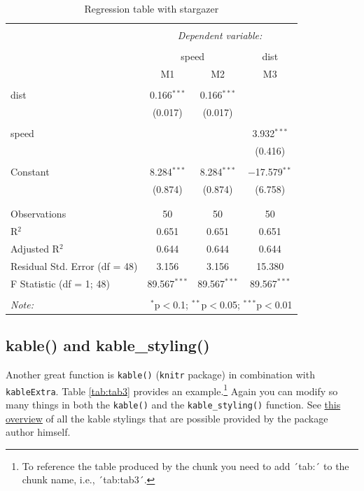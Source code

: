 \documentclass[
  12pt,
]{article}
\begin{document}
\begin{table}[H] \centering 
  \caption{Regression table with stargazer} 
  \label{tab2} 
\begin{tabular}{@{\extracolsep{5pt}}lccc} 
\\[-1.8ex]\hline 
\hline \\[-1.8ex] 
 & \multicolumn{3}{c}{\textit{Dependent variable:}} \\ 
\cline{2-4} 
\\[-1.8ex] & \multicolumn{2}{c}{speed} & dist \\ 
 & M1 & M2 & M3 \\ 
\hline \\[-1.8ex] 
 dist & 0.166$^{***}$ & 0.166$^{***}$ &  \\ 
  & (0.017) & (0.017) &  \\ 
  & & & \\ 
 speed &  &  & 3.932$^{***}$ \\ 
  &  &  & (0.416) \\ 
  & & & \\ 
 Constant & 8.284$^{***}$ & 8.284$^{***}$ & $-$17.579$^{**}$ \\ 
  & (0.874) & (0.874) & (6.758) \\ 
  & & & \\ 
\hline \\[-1.8ex] 
Observations & 50 & 50 & 50 \\ 
R$^{2}$ & 0.651 & 0.651 & 0.651 \\ 
Adjusted R$^{2}$ & 0.644 & 0.644 & 0.644 \\ 
Residual Std. Error (df = 48) & 3.156 & 3.156 & 15.380 \\ 
F Statistic (df = 1; 48) & 89.567$^{***}$ & 89.567$^{***}$ & 89.567$^{***}$ \\ 
\hline 
\hline \\[-1.8ex] 
\textit{Note:}  & \multicolumn{3}{r}{$^{*}$p$<$0.1; $^{**}$p$<$0.05; $^{***}$p$<$0.01} \\ 
\end{tabular} 
\end{table}

\hypertarget{kable-and-kable_styling}{%
\subsection{kable() and kable\_styling()}\label{kable-and-kable_styling}}

Another great function is \texttt{kable()} (\texttt{knitr} package) in combination with \texttt{kableExtra}. Table \ref{tab:tab3} provides an example.\footnote{To reference the table produced by the chunk you need to add ´tab:´ to the chunk name, i.e., ´tab:tab3´.} Again you can modify so many things in both the \texttt{kable()} and the \texttt{kable\_styling()} function. See \href{https://haozhu233.github.io/kableExtra/awesome_table_in_pdf.pdf}{this overview} of all the kable stylings that are possible provided by the package author himself.
\end{document}
